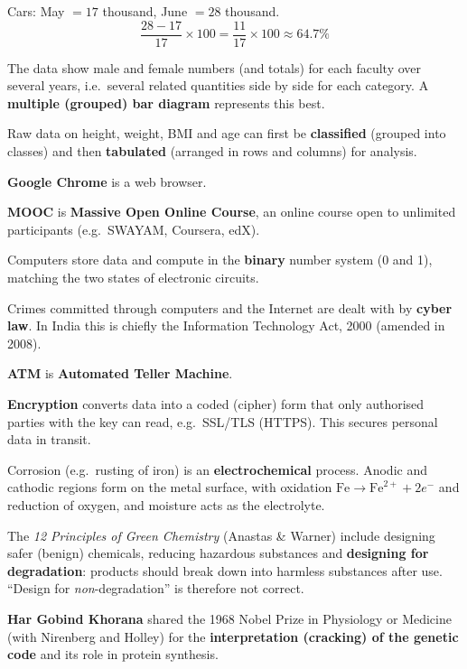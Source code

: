 Cars: May $=17$ thousand, June $=28$ thousand.
\[\frac{28-17}{17}\times100=\frac{11}{17}\times100\approx\mathbf{64.7\%}\]

The data show male and female numbers (and totals) for each faculty over several years, i.e.\ several related quantities side by side for each category. A \textbf{multiple (grouped) bar diagram} represents this best.

Raw data on height, weight, BMI and age can first be \textbf{classified} (grouped into classes) and then \textbf{tabulated} (arranged in rows and columns) for analysis.

\textbf{Google Chrome} is a web browser.

\textbf{MOOC} is \textbf{Massive Open Online Course}, an online course open to unlimited participants (e.g.\ SWAYAM, Coursera, edX).

Computers store data and compute in the \textbf{binary} number system (0 and 1), matching the two states of electronic circuits.

Crimes committed through computers and the Internet are dealt with by \textbf{cyber law}. In India this is chiefly the Information Technology Act, 2000 (amended in 2008).

\textbf{ATM} is \textbf{Automated Teller Machine}.

\textbf{Encryption} converts data into a coded (cipher) form that only authorised parties with the key can read, e.g.\ SSL/TLS (HTTPS). This secures personal data in transit.

Corrosion (e.g.\ rusting of iron) is an \textbf{electrochemical} process. Anodic and cathodic regions form on the metal surface, with oxidation $\mathrm{Fe}\rightarrow\mathrm{Fe}^{2+}+2e^-$ and reduction of oxygen, and moisture acts as the electrolyte.

The \emph{12 Principles of Green Chemistry} (Anastas \& Warner) include designing safer (benign) chemicals, reducing hazardous substances and \textbf{designing for degradation}: products should break down into harmless substances after use. ``Design for \emph{non}-degradation'' is therefore not correct.

\textbf{Har Gobind Khorana} shared the 1968 Nobel Prize in Physiology or Medicine (with Nirenberg and Holley) for the \textbf{interpretation (cracking) of the genetic code} and its role in protein synthesis.

